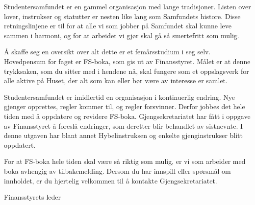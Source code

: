 \begin{forord}
Studentersamfundet er en gammel organisasjon med lange tradisjoner. Listen over lover, instrukser og statutter er
nesten like lang som Samfundets histore. Disse retningslinjene er til for at alle vi som jobber på Samfundet skal kunne
leve sammen i harmoni, og for at arbeidet vi gjør skal gå så smertefritt som mulig.

Å skaffe seg en oversikt over alt dette er et femårsstudium i seg selv. Hovedpensum for faget er FS-boka, som gis ut
av Finansstyret. Målet er at denne trykksaken, som du sitter med i hendene nå, skal fungere som et oppslagsverk for
alle aktive på Huset, der alt som kan eller bør være av interesse er samlet.

Studentersamfundet er imidlertid en organisasjon i kontinuerlig endring. Nye gjenger opprettes, regler kommer til, og
regler forsvinner. Derfor jobbes det hele tiden med å oppdatere og revidere FS-boka. Gjengsekretariatet har fått i
oppgave av Finansstyret å foreslå endringer, som deretter blir behandlet av sistnevnte. I denne utgaven har blant annet
Hybelinstruksen og enkelte gjenginstrukser blitt oppdatert.

For at FS-boka hele tiden skal være så riktig som mulig, er vi som arbeider med boka avhengig av tilbakemelding.
Dersom du har innspill eller spørsmål om innholdet, er du hjertelig velkommen til å kontakte Gjengsekretariatet.



\vfill


Finansstyrets leder


\end{forord}

